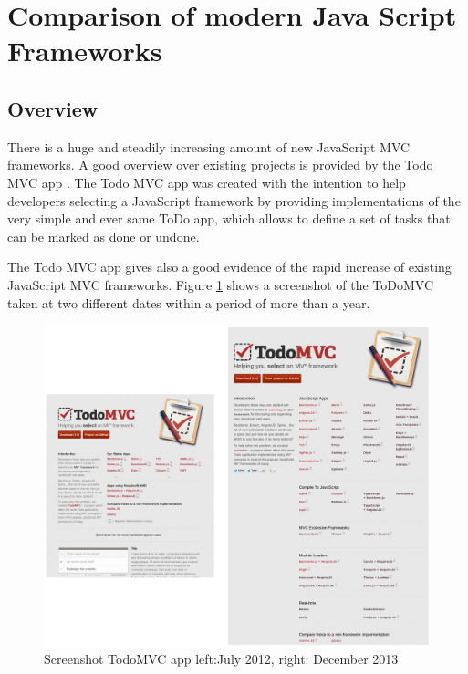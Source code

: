 \section{Comparison of modern Java Script Frameworks}

\subsection{Overview}

There is a huge and steadily increasing amount of new JavaScript MVC frameworks.
A good overview over existing projects is provided by the Todo MVC app \autocite{tech-ana:todo-mvc}.
The Todo MVC app was created with the intention to help developers selecting a JavaScript framework by providing implementations of the very simple and ever same ToDo app, which allows to define a set of tasks that can be marked as done or undone.


The Todo MVC app gives also a good evidence of the rapid increase of existing JavaScript MVC frameworks.
Figure \ref{fig:todoMvcComp} shows a screenshot of the ToDoMVC taken at two different dates within a period of more than a year.

\begin{figure}
	\centering	\includegraphics[width=1.0\textwidth]{./img/tech-ana/todo_mvc_app_comparison.png}
	\caption{Screenshot TodoMVC app left:July 2012, right: December 2013}
	\label{fig:todoMvcComp}
\end{figure}

